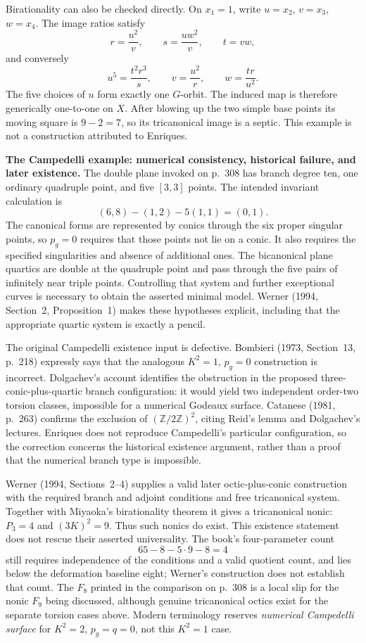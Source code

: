 \begin{example}
Birationality can also be checked directly. On \(x_1=1\), write \(u=x_2\), \(v=x_3\), \(w=x_4\). The image ratios satisfy
\[
r=\frac{u^2}{v},\qquad s=\frac{uw^2}{v},\qquad t=vw,
\]
and conversely
\[
u^5=\frac{t^2r^3}{s},\qquad
v=\frac{u^2}{r},\qquad w=\frac{tr}{u^2}.
\]
The five choices of \(u\) form exactly one \(G\)-orbit. The induced map is therefore generically one-to-one on \(X\). After blowing up the two simple base points its moving square is \(9-2=7\), so its tricanonical image is a septic. This example is not a construction attributed to Enriques.
\end{example}

\textbf{The Campedelli example: numerical consistency, historical failure, and later existence.}
The double plane invoked on p.~308 has branch degree ten, one ordinary quadruple point, and five \([3,3]\) points. The intended invariant calculation is
\[
(6,8)-(1,2)-5(1,1)=(0,1).
\]
The canonical forms are represented by conics through the six proper singular points, so \(p_g=0\) requires that those points not lie on a conic. It also requires the specified singularities and absence of additional ones. The bicanonical plane quartics are double at the quadruple point and pass through the five pairs of infinitely near triple points. Controlling that system and further exceptional curves is necessary to obtain the asserted minimal model. Werner (1994, Section~2, Proposition~1) makes these hypotheses explicit, including that the appropriate quartic system is exactly a pencil.

The original Campedelli existence input is defective. Bombieri (1973, Section~13, p.~218) expressly says that the analogous \(K^2=1\), \(p_g=0\) construction is incorrect. Dolgachev's account identifies the obstruction in the proposed three-conic-plus-quartic branch configuration: it would yield two independent order-two torsion classes, impossible for a numerical Godeaux surface. Catanese (1981, p.~263) confirms the exclusion of \((\mathbb Z/2\mathbb Z)^2\), citing Reid's lemma and Dolgachev's lectures. Enriques does not reproduce Campedelli's particular configuration, so the correction concerns the historical existence argument, rather than a proof that the numerical branch type is impossible.

Werner (1994, Sections~2--4) supplies a valid later octic-plus-conic construction with the required branch and adjoint conditions and free tricanonical system. Together with Miyaoka's birationality theorem it gives a tricanonical nonic: \(P_3=4\) and \((3K)^2=9\). Thus such nonics do exist. This existence statement does not rescue their asserted universality. The book's four-parameter count
\[
65-8-5\cdot9-8=4
\]
still requires independence of the conditions and a valid quotient count, and lies below the deformation baseline eight; Werner's construction does not establish that count. The \(F_8\) printed in the comparison on p.~308 is a local slip for the nonic \(F_9\) being discussed, although genuine tricanonical octics exist for the separate torsion cases above. Modern terminology reserves \emph{numerical Campedelli surface} for \(K^2=2\), \(p_g=q=0\), not this \(K^2=1\) case.

